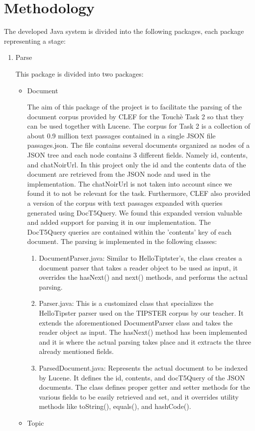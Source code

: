 \section{Methodology}
\label{sec:methodology}

The developed Java system is divided into the following packages, each package representing a stage:

\begin{enumerate}
  \item Parse
  
  This package is divided into two packages: 
    \begin{itemize}
        \item Document
        
            The aim of this package of the project is to facilitate the parsing of the document corpus provided by CLEF for the Touchè Task 2 so that they can be used together with Lucene. The corpus for Task 2 is a collection of about 0.9 million text passages contained in a single JSON file passages.json. The file contains several documents organized as nodes of a JSON tree and each node contains 3 different fields. Namely id, contents, and chatNoirUrl. In this project only the id and the contents data of the document are retrieved from the JSON node and used in the implementation. The chatNoirUrl is not taken into account since we found it to not be relevant for the task. Furthermore, CLEF also provided a version of the corpus with text passages expanded with queries generated using DocT5Query. We found this expanded version valuable and added support for parsing it in our implementation. The DocT5Query queries are contained within the 'contents' key of each document. The parsing is implemented in the following classes:
            \begin{enumerate}
                \item 
                    DocumentParser.java: Similar to HelloTiptster’s, the class creates a     document parser that takes a reader object to be used as input, it overrides the hasNext() and next() methods, and performs the actual parsing.
                \item 
                    Parser.java: This is a customized class that specializes the HelloTipster parser used on the TIPSTER corpus by our teacher. It extends the aforementioned DocumentParser class and takes the reader object as input. The hasNext() method has been implemented and it is where the actual parsing takes place and it extracts the three already mentioned fields.
                \item
                    ParsedDocument.java: Represents the actual document to be indexed by Lucene. It defines the id, contents, and docT5Query of the JSON documents. The class defines proper getter and setter methods for the various fields to be easily retrieved and set, and it overrides utility methods like toString(), equals(), and hashCode().
            \end{enumerate}
        \item Topic
        

\end{itemize}
\end{enumerate}
